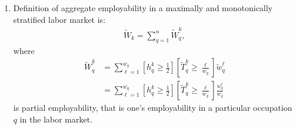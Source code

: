 \documentclass[hidelinks, nonatbib]{elsarticle}
\begin{document}
\begin{enumerate}
    \item 
    Definition of aggregate employability in a maximally and monotonically stratified labor market is: 
    \begin{gather}
        \tilde{W}_{k}
        =
        \sum_{q=1}^{n}
        \tilde{W}_{q}^{k}
        ,
    \end{gather}
    where
    \begin{align}
        \tilde{W}_{q}^{k}
        &=
        \sum_{\ell=1}^{w_q}
        \left[
            h_{q}^{k}
            \geq
            \frac{1}{2}
        \right]
        \left[
            \tilde{T}_{q}^{k}
            \geq 
            \frac{\ell}{w_q}
        \right]
        \tilde{w}_{q}^{\ell}
        \\
        &=
        \sum_{\ell=1}^{w_q}
        \left[
            h_{q}^{k}
            \geq
            \frac{1}{2}
        \right]
        \left[
            \tilde{T}_{q}^{k}
            \geq 
            \frac{\ell}{w_q}
        \right]
        \frac{
            {w}_{q}^{\ell}
        }{
            w_q
        }
    \end{align}
    is partial employability, that is one's employability in a particular occupation $q$ in the labor market.


\end{enumerate}
\end{document}

